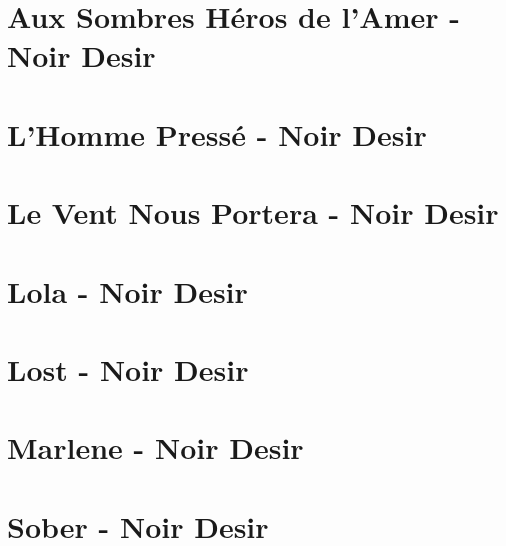 \documentclass{guitartabs}
\begin{document}
\section{Aux Sombres Héros de l'Amer - Noir Desir}
\begin{guitar}

\end{guitar}


\section*{L'Homme Pressé - Noir Desir}
\begin{guitar}

\end{guitar}

\section{Le Vent Nous Portera - Noir Desir}
\begin{guitar}

\end{guitar}


\section*{Lola - Noir Desir}
\begin{guitar}

\end{guitar}


\section*{Lost - Noir Desir}
\begin{guitar}

\end{guitar}

\section*{Marlene - Noir Desir}
\begin{guitar}

\end{guitar}

\section*{Sober - Noir Desir}
\begin{guitar}

\end{guitar}
\end{document}
